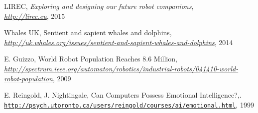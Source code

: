 \documentclass[article]{IEEEtran}
\begin{document}
\begin{thebibliography}{9}
LIREC, \textit{Exploring and designing our future robot companions},
\\\textit{\url{http://lirec.eu}}, 2015

Whales UK, Sentient and sapient whales and dolphins,
\\\textit{\url{http://uk.whales.org/issues/sentient-and-sapient-whales-and-dolphins}}, 2014

 E. Guizzo, World Robot Population Reaches 8.6 Million,
\\\textit{\url{http://spectrum.ieee.org/automaton/robotics/industrial-robots/041410-world-robot-population}}, 2009

E. Reingold, J. Nightingale, Can Computers Possess Emotional Intelligence?,.
\\\texttt{\url{http://psych.utoronto.ca/users/reingold/courses/ai/emotional.html}}, 1999

\end{thebibliography}
\end{document}
